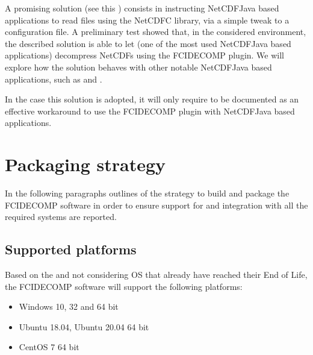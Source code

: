 \documentclass[a4paper,10pt,english]{sphinxmanual}
\begin{document}
\sphinxAtStartPar
A promising solution (see this {\hyperref[\detokenize{introduction:netcdf-java-github}]{}}) consists in instructing NetCDF\sphinxhyphen{}Java based
applications to read files using the NetCDF\sphinxhyphen{}C library, via a simple tweak to a configuration file. A preliminary test
showed that, in the considered environment, the described solution is able to let {\hyperref[\detokenize{introduction:panoply}]{}} (one of the
most used NetCDF\sphinxhyphen{}Java based applications) decompress NetCDFs using the FCIDECOMP plugin. We will explore how the
solution behaves with other notable NetCDF\sphinxhyphen{}Java based applications, such as {\hyperref[\detokenize{introduction:hdfview}]{}} and
{\hyperref[\detokenize{introduction:netcdf-java}]{}}.

\sphinxAtStartPar
In the case this solution is adopted, it will only require to be documented as an effective work\sphinxhyphen{}around to use the
FCIDECOMP plugin with NetCDF\sphinxhyphen{}Java based applications.


\chapter{Packaging strategy}
\label{\detokenize{packaging_strategy:packaging-strategy}}\label{\detokenize{packaging_strategy::doc}}
\sphinxAtStartPar
In the following paragraphs outlines of the strategy to build and package the FCIDECOMP software in order to ensure
support for and integration with all the required systems are reported.


\section{Supported platforms}
\label{\detokenize{packaging_strategy:supported-platforms}}\label{\detokenize{packaging_strategy:id1}}
\sphinxAtStartPar
Based on the {\hyperref[\detokenize{introduction:fcidecomp-wpd}]{}} and not considering OS that already have reached their
End of Life, the FCIDECOMP software will support the following platforms:
\begin{itemize}
\item {} 
\sphinxAtStartPar
Windows 10, 32 and 64 bit

\item {} 
\sphinxAtStartPar
Ubuntu 18.04, Ubuntu 20.04 64 bit

\item {} 
\sphinxAtStartPar
CentOS 7 64 bit

\end{itemize}
\end{document}
